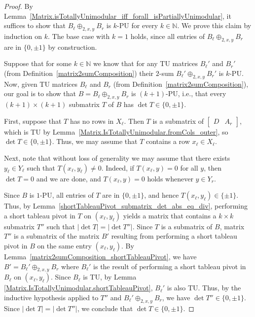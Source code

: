 \begin{proof}
    \leanok
    By Lemma~\ref{Matrix.isTotallyUnimodular_iff_forall_isPartiallyUnimodular}, it suffices to show that $B_{\ell} \oplus_{2, x, y} B_{r}$ is $k$-PU for every $k \in \mathbb{N}$. We prove this claim by induction on $k$. The base case with $k = 1$ holds, since all entries of $B_{\ell} \oplus_{2, x, y} B_{r}$ are in $\{0, \pm 1\}$ by construction.

    Suppose that for some $k \in \mathbb{N}$ we know that for any TU matrices $B_{\ell}'$ and $B_{r}'$ (from Definition~\ref{matrix2sumComposition}) their $2$-sum $B_{\ell}' \oplus_{2, x, y} B_{r}'$ is $k$-PU. Now, given TU matrices $B_{\ell}$ and $B_{r}$ (from Definition~\ref{matrix2sumComposition}), our goal is to show that $B = B_{\ell} \oplus_{2, x, y} B_{r}$ is $(k + 1)$-PU, i.e., that every $(k + 1) \times (k + 1)$ submatrix $T$ of $B$ has $\det T \in \{0, \pm 1\}$.

    First, suppose that $T$ has no rows in $X_{\ell}$. Then $T$ is a submatrix of $\begin{bmatrix} D & A_{r} \end{bmatrix}$, which is TU by Lemma~\ref{Matrix.IsTotallyUnimodular.fromCols_outer}, so $\det T \in \{0, \pm 1\}$. Thus, we may assume that $T$ contains a row $x_{\ell} \in X_{\ell}$.

    Next, note that without loss of generality we may assume that there exists $y_{\ell} \in Y_{\ell}$ such that $T (x_{\ell}, y_{\ell}) \neq 0$. Indeed, if $T (x_{\ell}, y) = 0$ for all $y$, then $\det T = 0$ and we are done, and $T (x_{\ell}, y) = 0$ holds whenever $y \in Y_{r}$.

    Since $B$ is $1$-PU, all entries of $T$ are in $\{0, \pm 1\}$, and hence $T (x_{\ell}, y_{\ell}) \in \{\pm 1\}$. Thus, by Lemma~\ref{shortTableauPivot_submatrix_det_abs_eq_div}, performing a short tableau pivot in $T$ on $(x_{\ell}, y_{\ell})$ yields a matrix that contains a $k \times k$ submatrix $T''$ such that $|\det T| = |\det T''|$. Since $T$ is a submatrix of $B$, matrix $T''$ is a submatrix of the matrix $B'$ resulting from performing a short tableau pivot in $B$ on the same entry $(x_{\ell}, y_{\ell})$. By Lemma~\ref{matrix2sumComposition_shortTableauPivot}, we have $B' = B_{\ell}' \oplus_{2, x, y} B_{r}$ where $B_{\ell}'$ is the result of performing a short tableau pivot in $B_{\ell}$ on $(x_{\ell}, y_{\ell})$. Since $B_{\ell}$ is TU, by Lemma \ref{Matrix.IsTotallyUnimodular.shortTableauPivot}, $B_{\ell}'$ is also TU. Thus, by the inductive hypothesis applied to $T''$ and $B_{\ell}' \oplus_{2, x, y} B_{r}$, we have $\det T'' \in \{0, \pm 1\}$. Since $|\det T| = |\det T''|$, we conclude that $\det T \in \{0, \pm 1\}$.
\end{proof}

